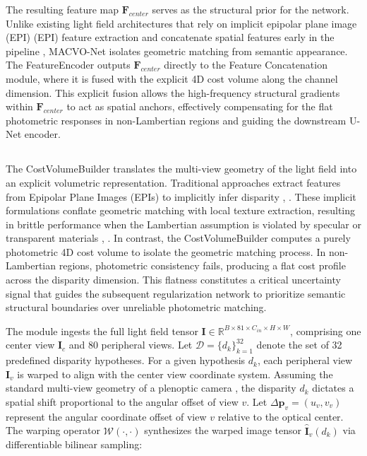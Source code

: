 \documentclass[lettersize,journal]{IEEEtran}
\begin{document}
The resulting feature map $\mathbf{F}_{center}$ serves as the structural prior for the network. Unlike existing light field architectures that rely on implicit epipolar plane image (EPI) (EPI) feature extraction and concatenate spatial features early in the pipeline \cite{heber2018}, MACVO-Net isolates geometric matching from semantic appearance. The FeatureEncoder outputs $\mathbf{F}_{center}$ directly to the Feature Concatenation module, where it is fused with the explicit 4D cost volume along the channel dimension. This explicit fusion allows the high-frequency structural gradients within $\mathbf{F}_{center}$ to act as spatial anchors, effectively compensating for the flat photometric responses in non-Lambertian regions and guiding the downstream U-Net encoder.

\subsection{}

The CostVolumeBuilder translates the multi-view geometry of the light field into an explicit volumetric representation. Traditional approaches extract features from Epipolar Plane Images (EPIs) to implicitly infer disparity \cite{wanner2014}, \cite{heber2018}. These implicit formulations conflate geometric matching with local texture extraction, resulting in brittle performance when the Lambertian assumption is violated by specular or transparent materials \cite{li2021}, \cite{zhang2023}. In contrast, the CostVolumeBuilder computes a purely photometric 4D cost volume to isolate the geometric matching process. In non-Lambertian regions, photometric consistency fails, producing a flat cost profile across the disparity dimension. This flatness constitutes a critical uncertainty signal that guides the subsequent regularization network to prioritize semantic structural boundaries over unreliable photometric matching.

The module ingests the full light field tensor $\mathbf{I} \in \mathbb{R}^{B \times 81 \times C_{in} \times H \times W}$, comprising one center view $\mathbf{I}_c$ and 80 peripheral views. Let $\mathcal{D} = \{d_k\}_{k=1}^{32}$ denote the set of 32 predefined disparity hypotheses. For a given hypothesis $d_k$, each peripheral view $\mathbf{I}_v$ is warped to align with the center view coordinate system. Assuming the standard multi-view geometry of a plenoptic camera \cite{ng2005}, the disparity $d_k$ dictates a spatial shift proportional to the angular offset of view $v$. Let $\Delta \mathbf{p}_v = (u_v, v_v)$ represent the angular coordinate offset of view $v$ relative to the optical center. The warping operator $\mathcal{W}(\cdot, \cdot)$ synthesizes the warped image tensor $\hat{\mathbf{I}}_v(d_k)$ via differentiable bilinear sampling:
\end{document}
